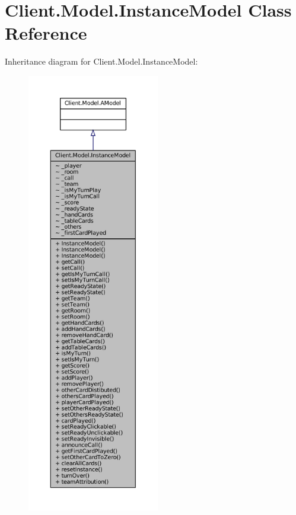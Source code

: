\hypertarget{classClient_1_1Model_1_1InstanceModel}{}\section{Client.\+Model.\+Instance\+Model Class Reference}
\label{classClient_1_1Model_1_1InstanceModel}


Inheritance diagram for Client.\+Model.\+Instance\+Model\+:
\nopagebreak
\begin{figure}[H]
\begin{center}
\leavevmode
\includegraphics[height=550pt]{classClient_1_1Model_1_1InstanceModel__inherit__graph}
\end{center}
\end{figure}


